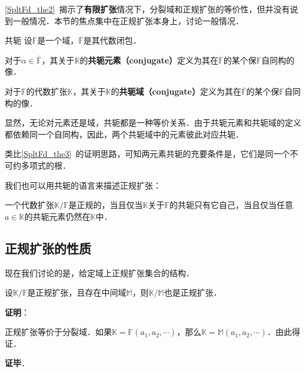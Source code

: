 

\autoref{SpltFd_the2}~揭示了\textbf{有限扩张}情况下，分裂域和正规扩张的等价性，但并没有说到一般情况．本节的焦点集中在正规扩张本身上，讨论一般情况．


\begin{definition}{共轭}
设$\mathbb{F}$是一个域，$\overline{\mathbb{F}}$是其代数闭包．

对于$\alpha\in\overline{\mathbb{F}}$，其关于$\mathbb{K}$的\textbf{共轭元素（conjugate）}定义为其在$\overline{\mathbb{F}}$的某个保$\mathbb{F}$自同构的像．

对于$\mathbb{F}$的代数扩张$\mathbb{K}$，其关于$\mathbb{K}$的\textbf{共轭域（conjugate）}定义为其在$\overline{\mathbb{F}}$的某个保$\mathbb{F}$自同构的像．
\end{definition}

显然，无论对元素还是域，共轭都是一种等价关系．由于共轭元素和共轭域的定义都依赖同一个自同构，因此，两个共轭域中的元素彼此对应共轭．

类比\autoref{SpltFd_the3}~的证明思路，可知两元素共轭的充要条件是，它们是同一个不可约多项式的根．

我们也可以用共轭的语言来描述正规扩张：

\begin{theorem}{}\label{NomEx_the1}
一个代数扩张$\mathbb{K}/\mathbb{F}$是正规的，当且仅当$\mathbb{K}$关于$\mathbb{F}$的共轭只有它自己，当且仅当任意$a\in\mathbb{K}$的共轭元素仍然在$\mathbb{K}$中．
\end{theorem}



\subsection{正规扩张的性质}

现在我们讨论的是，给定域上正规扩张集合的结构．

\begin{theorem}{}
设$\mathbb{K}/\mathbb{F}$是正规扩张，且存在中间域$\mathbb{M}$，则$\mathbb{K}/\mathbb{M}$也是正规扩张．
\end{theorem}

\textbf{证明}：

正规扩张等价于分裂域．如果$\mathbb{K}=\mathbb{F}(a_1, a_2, \cdots)$，那么$\mathbb{K}=\mathbb{M}(a_1, a_2, \cdots)$．由此得证．

\textbf{证毕}．


